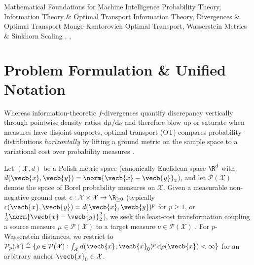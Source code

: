 \documentclass[../../../../master.tex]{subfiles}
\begin{document}
\monographleaf
  {Mathematical Foundations for Machine Intelligence}
  {Probability Theory, Information Theory \& Optimal Transport}
  {Information Theory, Divergences \& Optimal Transport}
  {Monge-Kantorovich Optimal Transport, Wasserstein Metrics \& Sinkhorn Scaling}
  {, , }

\section{Problem Formulation \& Unified Notation}
\label{sec:ot:formulation}

Whereas information-theoretic $f$-divergences quantify discrepancy vertically through pointwise density ratios $\mathrm{d}\mu / \mathrm{d}\nu$ and therefore blow up or saturate when measures have disjoint supports, optimal transport (OT) compares probability distributions \emph{horizontally} by lifting a ground metric on the sample space to a variational cost over probability measures  .

Let $(\mathcal{X}, d)$ be a Polish metric space (canonically Euclidean space $\R^d$ with $d(\vecb{x}, \vecb{y}) = \norm{\vecb{x} - \vecb{y}}_2$), and let $\mathcal{P}(\mathcal{X})$ denote the space of Borel probability measures on $\mathcal{X}$. Given a measurable non-negative ground cost $c : \mathcal{X} \times \mathcal{X} \to \R_{\ge 0}$ (typically $c(\vecb{x}, \vecb{y}) = d(\vecb{x}, \vecb{y})^p$ for $p \ge 1$, or $\frac{1}{2}\norm{\vecb{x}-\vecb{y}}_2^2$), we seek the least-cost transformation coupling a source measure $\mu \in \mathcal{P}(\mathcal{X})$ to a target measure $\nu \in \mathcal{P}(\mathcal{X})$ . For $p$-Wasserstein distances, we restrict to $\mathcal{P}_p(\mathcal{X}) \triangleq \{ \rho \in \mathcal{P}(\mathcal{X}) : \int_{\mathcal{X}} d(\vecb{x}, \vecb{x}_0)^p\,\mathrm{d}\rho(\vecb{x}) < \infty \}$ for an arbitrary anchor $\vecb{x}_0 \in \mathcal{X}$.
\end{document}

